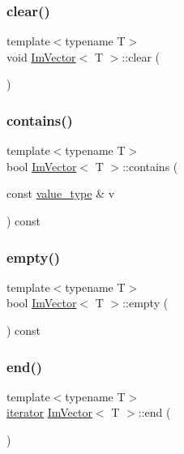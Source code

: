 \subsubsection{\texorpdfstring{clear()}{clear()}}
{\footnotesize\ttfamily template$<$typename T$>$ \\
void \hyperlink{class_im_vector}{Im\+Vector}$<$ T $>$\+::clear (\begin{DoxyParamCaption}{ }\end{DoxyParamCaption})}

\hypertarget{class_im_vector_a8d3d5f3462afbf38d9e8f410ebd085ee}{}\label{class_im_vector_a8d3d5f3462afbf38d9e8f410ebd085ee} 
\subsubsection{\texorpdfstring{contains()}{contains()}}
{\footnotesize\ttfamily template$<$typename T$>$ \\
bool \hyperlink{class_im_vector}{Im\+Vector}$<$ T $>$\+::contains (\begin{DoxyParamCaption}\item[{const \hyperlink{class_im_vector_a8bd77e4e7581d8e5f9e98d7c2f3c2a80}{value\+\_\+type} \&}]{v }\end{DoxyParamCaption}) const}

\hypertarget{class_im_vector_aa53e48a5272f4bad1099368769514ff1}{}\label{class_im_vector_aa53e48a5272f4bad1099368769514ff1} 
\subsubsection{\texorpdfstring{empty()}{empty()}}
{\footnotesize\ttfamily template$<$typename T$>$ \\
bool \hyperlink{class_im_vector}{Im\+Vector}$<$ T $>$\+::empty (\begin{DoxyParamCaption}{ }\end{DoxyParamCaption}) const}

\hypertarget{class_im_vector_a947fbc3b1d8c1997e51ae6caab440379}{}\label{class_im_vector_a947fbc3b1d8c1997e51ae6caab440379} 
\subsubsection{\texorpdfstring{end()}{end()}\hspace{0.1cm}{\footnotesize\ttfamily [1/2]}}
{\footnotesize\ttfamily template$<$typename T$>$ \\
\hyperlink{class_im_vector_a74b5478f1f6fd471cc71219bce483db6}{iterator} \hyperlink{class_im_vector}{Im\+Vector}$<$ T $>$\+::end (\begin{DoxyParamCaption}{ }\end{DoxyParamCaption})}

